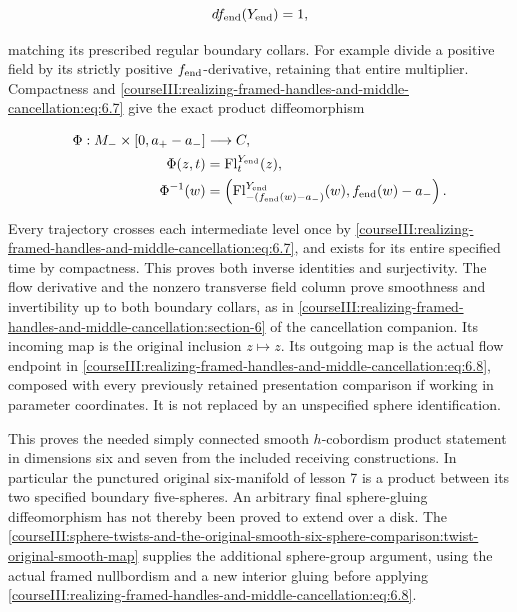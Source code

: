 \begin{equation}
df_{\rm end}(Y_{\rm end})=1,
 \label{courseIII:realizing-framed-handles-and-middle-cancellation:eq:6.7}
\end{equation}

matching its prescribed regular boundary collars. For example divide a positive field by its strictly positive \(f_{\rm end}\)-derivative, retaining that entire multiplier. Compactness and \eqref{courseIII:realizing-framed-handles-and-middle-cancellation:eq:6.7} give the exact product diffeomorphism

\begin{equation}
\begin{aligned}
 \Phi:M_-\times[0,a_+-a_-]&\longrightarrow C,\\
 \Phi(z,t)&=\operatorname{Fl}^{Y_{\rm end}}_t(z),\\
 \Phi^{-1}(w)&=
 \left(\operatorname{Fl}^{Y_{\rm end}}_{-(f_{\rm end}(w)-a_-)}(w),
                       f_{\rm end}(w)-a_-\right).
 \end{aligned}
 \label{courseIII:realizing-framed-handles-and-middle-cancellation:eq:6.8}
\end{equation}

Every trajectory crosses each intermediate level once by \eqref{courseIII:realizing-framed-handles-and-middle-cancellation:eq:6.7}, and exists for its entire specified time by compactness. This proves both inverse identities and surjectivity. The flow derivative and the nonzero transverse field column prove smoothness and invertibility up to both boundary collars, as in \cref{courseIII:realizing-framed-handles-and-middle-cancellation:section-6} of the cancellation companion. Its incoming map is the original inclusion \(z\mapsto z\). Its outgoing map is the actual flow endpoint in \eqref{courseIII:realizing-framed-handles-and-middle-cancellation:eq:6.8}, composed with every previously retained presentation comparison if working in parameter coordinates. It is not replaced by an unspecified sphere identification.

This proves the needed simply connected smooth \(h\)-cobordism product statement in dimensions six and seven from the included receiving constructions. In particular the punctured original six-manifold of lesson 7 is a product between its two specified boundary five-spheres. An arbitrary final sphere-gluing diffeomorphism has not thereby been proved to extend over a disk. The \cref{courseIII:sphere-twists-and-the-original-smooth-six-sphere-comparison:twist-original-smooth-map} supplies the additional sphere-group argument, using the actual framed nullbordism and a new interior gluing before applying \eqref{courseIII:realizing-framed-handles-and-middle-cancellation:eq:6.8}.

